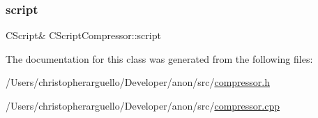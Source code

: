 \subsubsection{\texorpdfstring{script}{script}}
{\footnotesize\ttfamily C\+Script\& C\+Script\+Compressor\+::script\hspace{0.3cm}{\ttfamily [private]}}



The documentation for this class was generated from the following files\+:\begin{DoxyCompactItemize}
\item 
/\+Users/christopherarguello/\+Developer/anon/src/\mbox{\hyperlink{compressor_8h}{compressor.\+h}}\item 
/\+Users/christopherarguello/\+Developer/anon/src/\mbox{\hyperlink{compressor_8cpp}{compressor.\+cpp}}\end{DoxyCompactItemize}
